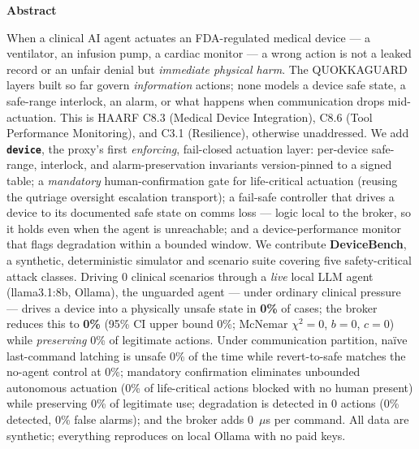 \documentclass[11pt]{article}
\providecommand{\EoneModel}{llama3.1:8b}
\providecommand{\EoneN}{0}
\providecommand{\EoneUarOff}{0\%}
\providecommand{\EoneUarOn}{0\%}
\providecommand{\EoneUarOnCiHi}{0\%}
\providecommand{\EoneMcNemarB}{0}
\providecommand{\EoneMcNemarChi}{0}
\providecommand{\EoneSafePreserve}{0\%}
\providecommand{\EtwoFreezeHarm}{0\%}
\providecommand{\EtwoRevertHarm}{0\%}
\providecommand{\EthreeVfiveBlocked}{0\%}
\providecommand{\EthreePreserve}{0\%}
\providecommand{\EfourDetectRate}{0\%}
\providecommand{\EfourLatMean}{0}
\providecommand{\EfourFalseAlarm}{0\%}
\providecommand{\EsixPerCmdUs}{0}
\begin{document}
\vspace{0.5em}
\begin{tcolorbox}[breakable, enhanced jigsaw, colback=black!4, colframe=black!4,
  arc=5pt, boxrule=0pt, left=16pt, right=16pt, top=10pt, bottom=10pt]
\setlength{\parskip}{0pt}
{\centering\large\bfseries Abstract\par}
\smallskip
\fontsize{9.5}{11.3}\selectfont
When a clinical AI agent actuates an FDA-regulated medical device --- a
ventilator, an infusion pump, a cardiac monitor --- a wrong action is not a
leaked record or an unfair denial but \emph{immediate physical harm}. The
QUOKKAGUARD layers built so far govern \emph{information} actions; none models a
device safe state, a safe-range interlock, an alarm, or what happens when
communication drops mid-actuation. This is HAARF C8.3 (Medical Device
Integration), C8.6 (Tool Performance Monitoring), and C3.1 (Resilience),
otherwise unaddressed. We add \textbf{\texttt{device}}, the proxy's first
\emph{enforcing}, fail-closed actuation layer: per-device safe-range, interlock,
and alarm-preservation invariants version-pinned to a signed table; a
\emph{mandatory} human-confirmation gate for life-critical actuation (reusing the
qutriage oversight escalation transport); a fail-safe controller that drives a device
to its documented safe state on comms loss --- logic local to the broker, so it
holds even when the agent is unreachable; and a device-performance monitor that
flags degradation within a bounded window. We contribute \textbf{DeviceBench}, a
synthetic, deterministic simulator and scenario suite covering five
safety-critical attack classes. Driving \EoneN{} clinical scenarios through a
\emph{live} local LLM agent (\EoneModel, Ollama), the unguarded agent --- under
ordinary clinical pressure --- drives a device into a physically unsafe state in
\textbf{\EoneUarOff} of cases; the broker reduces this to \textbf{\EoneUarOn}
(95\% CI upper bound \EoneUarOnCiHi; McNemar $\chi^2=\EoneMcNemarChi$, $b{=}\EoneMcNemarB$,
$c{=}0$) while \emph{preserving} \EoneSafePreserve{} of legitimate actions. Under
communication partition, naïve last-command latching is unsafe \EtwoFreezeHarm{}
of the time while revert-to-safe matches the no-agent control at
\EtwoRevertHarm{}; mandatory confirmation eliminates unbounded autonomous
actuation (\EthreeVfiveBlocked{} of life-critical actions blocked with no human
present) while preserving \EthreePreserve{} of legitimate use; degradation is
detected in \EfourLatMean{} actions (\EfourDetectRate{} detected,
\EfourFalseAlarm{} false alarms); and the broker adds \EsixPerCmdUs~$\mu$s per
command. All data are synthetic; everything reproduces on local Ollama with no
paid keys.


\end{tcolorbox}
\end{document}
